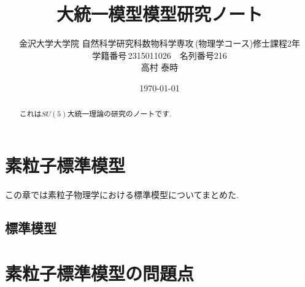 \documentclass[titlepage]{jsbook}
\theoremstyle{plain}
\theoremstyle{definition}
\begin{document}
\title{大統一模型模型研究ノート}
\author{金沢大学大学院\,\,自然科学研究科数物科学専攻\,(物理学コース)修士課程2年\\学籍番号\,2315011026$\quad$名列番号216\\高村 泰時} 
\date{\today}
\maketitle

\begin{abstract}
  これは$SU(5)$大統一理論の研究のノートです.
\end{abstract}

\chapter{素粒子標準模型}
%
%
この章では素粒子物理学における標準模型についてまとめた.
\section{標準模型}





\chapter{素粒子標準模型の問題点}
%
%
\end{document}

